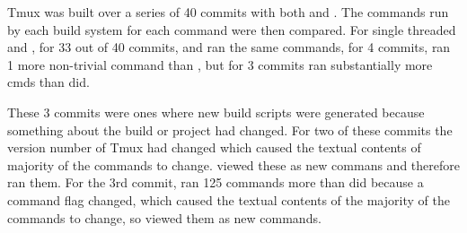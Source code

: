 Tmux was built over a series of 40 commits with both \Make and \Rattle.  The commands run by each build system for each command were then compared.  For single threaded \Rattle and \Make, for 33 out of 40 commits, \Rattle and \Make ran the same commands, for 4 commits, \Make ran 1 more non-trivial command than \Rattle, but for 3 commits \Rattle ran substantially more cmds than \Make did.

These 3 commits were ones where new \Rattle build scripts were generated because something about the build or project had changed.  For two of these commits the version number of Tmux had changed which caused the textual contents of majority of the commands to change.  \Rattle viewed these as new commans and therefore ran them.  For the 3rd commit, \Rattle ran 125 commands more than \Make did because a command flag changed, which caused the textual contents of the majority of the commands to change, so \Rattle viewed them as new commands.


















